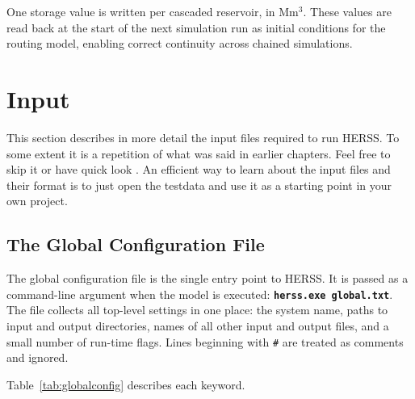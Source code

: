 \documentclass[a4paper, 12pt]{report}
\newcommand{\cmd}[1]{\textbf{\texttt{#1}}}
\begin{document}
	One storage value is written per cascaded reservoir, in Mm$^3$. These values are read back
	at the start of the next simulation run as initial conditions for the routing model, enabling correct continuity across chained simulations.

	\section{Input}
	This section describes in more detail the input files required to run HERSS. To some extent it is a repetition of what was said in earlier chapters. Feel free to skip it or have quick look \smiley{}. An efficient way to learn about the input files and their format is to just open the testdata and use it as a starting point in your own project. 
	
	\subsection{The Global Configuration File}
	\label{sec:globalconfig}

	The global configuration file is the single entry point to HERSS. It is passed as a
	command-line argument when the model is executed: \cmd{herss.exe global.txt}. 
	The file collects all top-level settings in one place: the system name, 
	paths to input and output directories, names of all other input and 
	output files, and a small number of run-time flags. 
	Lines beginning with \texttt{\#} are treated as comments and ignored.

	Table~\ref{tab:globalconfig} describes each keyword.
\end{document}
